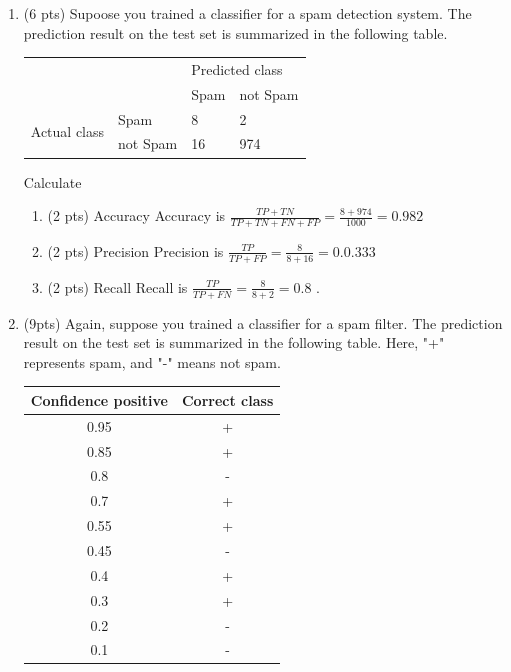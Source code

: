 \documentclass[a4paper]{article}
\theoremstyle{definition}
\newenvironment{soln}{
    \leavevmode\color{blue}\ignorespaces
}{}
\begin{document}
\begin{enumerate}
\begin{enumerate}
	\begin{soln}  \end{soln}
	
\end{enumerate}

\item (6 pts) Supoose you trained a classifier for a spam detection system. The prediction result on the test set is summarized in the following table.
\begin{center}
	\begin{tabular}{l l | l l}
		&          & \multicolumn{2}{l}{Predicted class} \\
		&          & Spam           & not Spam           \\
		\hline
		\multirow{2}{*}{Actual class} & Spam     & 8              & 2                  \\
		& not Spam & 16             & 974               
	\end{tabular}
\end{center}

Calculate
\begin{enumerate}
	\item (2 pts) Accuracy
	\begin{soln}  Accuracy is $\frac{TP+TN}{TP+TN+FN+FP}=\frac{8+974}{1000}=0.982$ \end{soln}
	\item (2 pts) Precision
	\begin{soln}  Precision is $\frac{TP}{TP+FP}=\frac{8}{8+16}=0.0.333$  \end{soln}
	\item (2 pts) Recall
	\begin{soln}  Recall is $\frac{TP}{TP+FN}=\frac{8}{8+2}=0.8$ . \end{soln}
\end{enumerate}


\item (9pts) Again, suppose you trained a classifier for a spam filter. The prediction result on the test set is summarized in the following table. Here, "+" represents spam, and "-" means not spam.

\begin{center}
\begin{tabular}{ c  c }
\hline
Confidence positive & Correct class \\ \hline
0.95 & + \\
0.85 & + \\
0.8 & - \\
0.7 & + \\
0.55 & + \\
0.45 & - \\
0.4 & + \\
0.3 & + \\
0.2 & - \\
0.1 & - \\
\hline
\end{tabular}
\end{center}


\end{enumerate}
\end{document}
